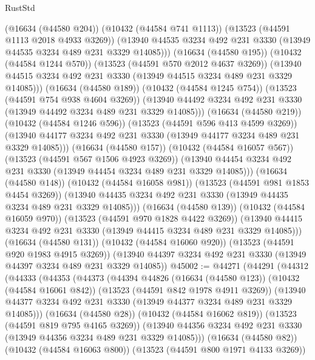 \begin{lexlean}{RustStd}
\begin{coremodule}
                  (@16634 (@44580 @204))
                  (@10432 (@44584 @741 @1113))
                  (@13523 (@44591 @1113 @2018 @4933 @3269))
                  (@13940
                    @44535
                    @3234
                    @492
                    @231
                    @3330
                    (@13949 @44535 @3234 @489 @231 @3329 @14085)))
                (@16634 (@44580 @195))
                (@10432 (@44584 @1244 @570))
                (@13523 (@44591 @570 @2012 @4637 @3269))
                (@13940 @44515 @3234 @492 @231 @3330 (@13949 @44515 @3234 @489 @231 @3329 @14085)))
              (@16634 (@44580 @189))
              (@10432 (@44584 @1245 @754))
              (@13523 (@44591 @754 @938 @4604 @3269))
              (@13940 @44492 @3234 @492 @231 @3330 (@13949 @44492 @3234 @489 @231 @3329 @14085)))
            (@16634 (@44580 @219))
            (@10432 (@44584 @1246 @596))
            (@13523 (@44591 @596 @413 @4599 @3269))
            (@13940 @44177 @3234 @492 @231 @3330 (@13949 @44177 @3234 @489 @231 @3329 @14085)))
          (@16634 (@44580 @157))
          (@10432 (@44584 @16057 @567))
          (@13523 (@44591 @567 @1506 @4923 @3269))
          (@13940 @44454 @3234 @492 @231 @3330 (@13949 @44454 @3234 @489 @231 @3329 @14085)))
        (@16634 (@44580 @148))
        (@10432 (@44584 @16058 @981))
        (@13523 (@44591 @981 @1853 @4454 @3269))
        (@13940 @44435 @3234 @492 @231 @3330 (@13949 @44435 @3234 @489 @231 @3329 @14085)))
      (@16634 (@44580 @139))
      (@10432 (@44584 @16059 @970))
      (@13523 (@44591 @970 @1828 @4422 @3269))
      (@13940 @44415 @3234 @492 @231 @3330 (@13949 @44415 @3234 @489 @231 @3329 @14085)))
    (@16634 (@44580 @131))
    (@10432 (@44584 @16060 @920))
    (@13523 (@44591 @920 @1983 @4915 @3269))
    (@13940 @44397 @3234 @492 @231 @3330 (@13949 @44397 @3234 @489 @231 @3329 @14085))
@45002 := @44271
    (@44291
      (@44312
        (@44333
          (@44353
            (@44373
              (@44394
                @44826
                (@16634 (@44580 @123))
                (@10432 (@44584 @16061 @842))
                (@13523 (@44591 @842 @1978 @4911 @3269))
                (@13940 @44377 @3234 @492 @231 @3330 (@13949 @44377 @3234 @489 @231 @3329 @14085)))
              (@16634 (@44580 @28))
              (@10432 (@44584 @16062 @819))
              (@13523 (@44591 @819 @795 @4165 @3269))
              (@13940 @44356 @3234 @492 @231 @3330 (@13949 @44356 @3234 @489 @231 @3329 @14085)))
            (@16634 (@44580 @82))
            (@10432 (@44584 @16063 @800))
            (@13523 (@44591 @800 @1971 @4133 @3269))

\end{coremodule}
\end{lexlean}
